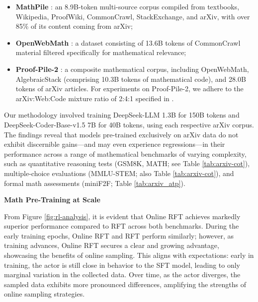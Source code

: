 \begin{itemize}[topsep=0pt]
\begin{itemize}[topsep=0pt]
\begin{itemize}[topsep=0pt]
    \item \textbf{MathPile} \citep{mathpile}: an 8.9B-token multi-source corpus compiled from textbooks, Wikipedia, ProofWiki, CommonCrawl, StackExchange, and arXiv, with over 85\% of its content coming from arXiv;
    \item \textbf{OpenWebMath} \citep{openwebmath}: a dataset consisting of 13.6B tokens of CommonCrawl material filtered specifically for mathematical relevance;
    \item \textbf{Proof-Pile-2} \citep{llemma}: a composite mathematical corpus, including OpenWebMath, AlgebraicStack (comprising 10.3B tokens of mathematical code), and 28.0B tokens of arXiv articles. For experiments on Proof-Pile-2, we adhere to the arXiv:Web:Code mixture ratio of 2:4:1 specified in \cite{llemma}.
\end{itemize}

Our methodology involved training DeepSeek-LLM 1.3B for 150B tokens and DeepSeek-Coder-Base-v1.5 7B for 40B tokens, using each respective arXiv corpus. The findings reveal that models pre-trained exclusively on arXiv data do not exhibit discernible gains—and may even experience regressions—in their performance across a range of mathematical benchmarks of varying complexity, such as quantitative reasoning tests (GSM8K, MATH; see Table \ref{tab:arxiv-cot}), multiple-choice evaluations (MMLU-STEM; also Table \ref{tab:arxiv-cot}), and formal math assessments (miniF2F; Table \ref{tab:arxiv_atp}).

\textbf{Math Pre-Training at Scale}

From Figure \ref{fig:rl-analysis}, it is evident that Online RFT achieves markedly superior performance compared to RFT across both benchmarks. During the early training epochs, Online RFT and RFT perform similarly; however, as training advances, Online RFT secures a clear and growing advantage, showcasing the benefits of online sampling. This aligns with expectations: early in training, the actor is still close in behavior to the SFT model, leading to only marginal variation in the collected data. Over time, as the actor diverges, the sampled data exhibits more pronounced differences, amplifying the strengths of online sampling strategies.


\end{itemize}
\end{itemize}
